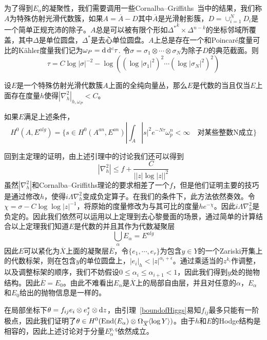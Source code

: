 为了得到$E_{\alpha}$的凝聚性，我们需要调用一些Cornalba--Griffiths~\cite{cornalba1975analytic}当中的结果，我们称$A$为特殊仿射光滑代数簇，如果$A=\overline{A}-D$其中$\overline{A}$是光滑射影簇，$D=\cup_{i=1}^{N} D_i$是一个简单正规充沛的除子。$A$总是可以被有限个形如${\Delta^*}^k\times \Delta^{n-k}$的坐标邻域所覆盖，其中$\Delta$是单位圆盘，$\Delta^*$是去心单位圆盘。$A$上总是存在一个和Poincar\'e度量可比的K\"ahler度量我们记为$\omega_P=\mathop{}\!\mathrm{d}\mathop{}\!\mathrm{d}^c\tau$. 令$\sigma=\sigma_1\otimes\cdots \otimes \sigma_N$为除子$D$的典范截面。则\[\tau=C\log|\sigma|^{-2}-\log((\log|\sigma_1|^2)^2\cdots(\log|\sigma_N|^2)^2)\]
\begin{theorem}[pp.23]\label{GAGAforbundle}
    设$E$是一个特殊仿射光滑代数簇$A$上面的全纯向量丛，那么$E$是代数的当且仅当$E$上面存在度量$h$使得$|\nabla_h^2|_{h,\omega_P}<C$。
\end{theorem}
\begin{theorem}[pp.24]\label{GAGAforbundle2}
    如果$E$满足上述条件，\[H^0(A,E^{alg})=\{s\in H^0(A^{an},E^{an})|\int_A |s|^2e^{-N\tau}\omega_p^n< \infty\quad\text{对某些整数N成立}\}\]
\end{theorem}

回到主定理的证明，由上述引理中的讨论我们还可以得到\[|\nabla_h^2|\leq f+\frac{C}{||z|\log|z||^2}\]
虽然$|\nabla_h^2|$和Cornalba--Griffiths理论的要求相差了一个$f$，但是他们证明主要的技巧是通过修改$h$，使得$i\Lambda\nabla_h^2$变成负定算子。在我们的条件下，此方法依然奏效。令$\chi=\sigma-C\log\log|z|^{-1}$，将原始的度量修改为与其可比的度量$he^{-\chi}$。因此$i\Lambda\nabla_h^2$是负定的。因此我们依然可以运用以上定理到去心黎曼面的场景，通过简单的计算结合以上定理我们知道$E$是代数的并且其作为代数凝聚层
\[
\bigcup_\alpha E_\alpha = E^{alg}
\]
因此$E$可以紧化为$\overline{X}$上面的凝聚层$\overline{E}$，令$\{e_1,\cdots,e_r\}$为包含$y\in Y$的一个Zariski开集上的代数标架，则在包含$y$的单位圆盘上，$|e_i|_h<|z|^{\alpha_i+\epsilon}$。通过乘适当的$z^{k_i}$作调整，以及调整标架的顺序，我们不妨假设$0\leq\alpha_i\leq\alpha_{i+1}<1$，因此我们得到$y$处的抛物结构。因此$\overline{E}=E_0$。由此不难看出$E_\alpha$是$\overline{X}$上的局部自由层，并且对任意的$\alpha$，$E_\alpha$和$E_0$给出的抛物信息是一样的。

在局部坐标下$\theta=f_{ij}e_i\otimes e_j^* \otimes \mathop{}\!\mathrm{d} z$，由引理~\ref{boundofHiggs}易知$f_{ij}$最多只能有一阶极点，因此我们证明了$\theta\in H^0(\operatorname{End}(E_\alpha)\otimes \Omega_{\overline{X}}\langle\log Y\rangle)$。由于$h$和$E$的Hodge结构是相容的，因此上述讨论对于分量$E_\alpha^{p,q}$依然成立。

